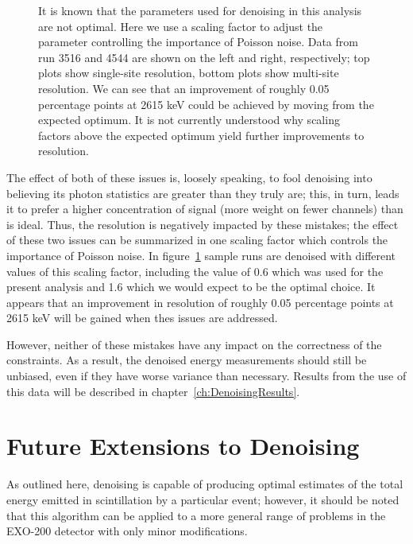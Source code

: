 \begin{figure}
\begin{quote}
\caption{It is known that the parameters used for denoising in this analysis are not optimal.  Here we use a scaling factor to adjust the parameter controlling the importance of Poisson noise.  Data from run 3516 and 4544 are shown on the left and right, respectively; top plots show single-site resolution, bottom plots show multi-site resolution.  We can see that an improvement of roughly 0.05 percentage points at 2615 keV could be achieved by moving from the expected optimum.  It is not currently understood why scaling factors above the expected optimum yield further improvements to resolution.}
\label{fig:Denoising_ResVsAPDGain_ScalingFactor}
\end{quote}
\end{figure}
\renewcommand{\baselinestretch}{2}
\small\normalsize

The effect of both of these issues is, loosely speaking, to fool denoising into believing its photon statistics are greater than they truly are; this, in turn, leads it to prefer a higher concentration of signal (more weight on fewer channels) than is ideal.  Thus, the resolution is negatively impacted by these mistakes; the effect of these two issues can be summarized in one scaling factor which controls the importance of Poisson noise.  In figure~\ref{fig:Denoising_ResVsAPDGain_ScalingFactor} sample runs are denoised with different values of this scaling factor, including the value of 0.6 which was used for the present analysis and 1.6 which we would expect to be the optimal choice.  It appears that an improvement in resolution of roughly 0.05 percentage points at 2615 keV will be gained when thes issues are addressed.

However, neither of these mistakes have any impact on the correctness of the constraints.  As a result, the denoised energy measurements should still be unbiased, even if they have worse variance than necessary.  Results from the use of this data will be described in chapter~\ref{ch:DenoisingResults}.

\section{Future Extensions to Denoising}\label{sec:FutureDenoisingExtensions}

As outlined here, denoising is capable of producing optimal estimates of the total energy emitted in scintillation by a particular event; however, it should be noted that this algorithm can be applied to a more general range of problems in the EXO-200 detector with only minor modifications.

